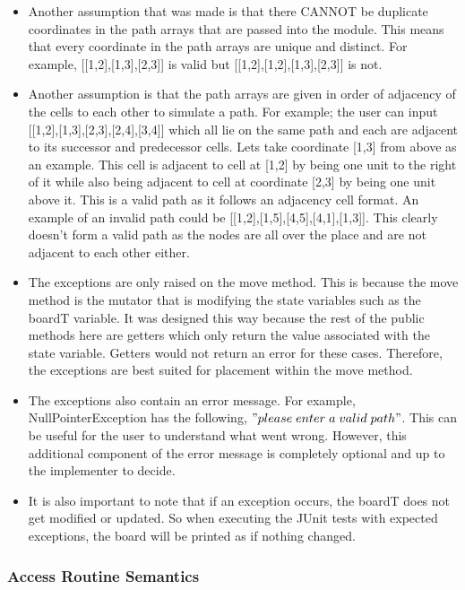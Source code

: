 \documentclass[12pt]{article}
\begin{document}
\begin{itemize}
\item Another assumption that was made is that there CANNOT be duplicate coordinates in the path arrays that are passed into the module. This means that every coordinate in the path arrays are unique and distinct. For example, [[1,2],[1,3],[2,3]] is valid but [[1,2],[1,2],[1,3],[2,3]] is not.

\item Another assumption is that the path arrays are given in order of adjacency of the cells to each other to simulate a path. For example; the user can input [[1,2],[1,3],[2,3],[2,4],[3,4]] which all lie on the same path and each are adjacent to its successor and predecessor cells. Lets take coordinate [1,3] from above as an example. This cell is adjacent to cell at [1,2] by being one unit to the right of it while also being adjacent to cell at coordinate [2,3] by being one unit above it. This is a valid path as it follows an adjacency cell format. An example of an invalid path could be [[1,2],[1,5],[4,5],[4,1],[1,3]]. This clearly doesn't form a valid path as the nodes are all over the place and are not adjacent to each other either.

\item The exceptions are only raised on the move method. This is because the move method is the mutator that is modifying the state variables such as the boardT variable. It was designed this way because the rest of the public methods here are getters which only return the value associated with the state variable. Getters would not return an error for these cases. Therefore, the exceptions are best suited for placement within the move method.

\item The exceptions also contain an error message. For example, NullPointerException has the following, $"please \thickspace enter \thickspace a \thickspace valid \thickspace path"$. This can be useful for the user to understand what went wrong. However, this additional component of the error message is completely optional and up to the implementer to decide.

\item It is also important to note that if an exception occurs, the boardT does not get modified or updated. So when executing the JUnit tests with expected exceptions, the board will be printed as if nothing changed.

\end{itemize}
\newpage

\subsubsection* {Access Routine Semantics}
\end{document}
